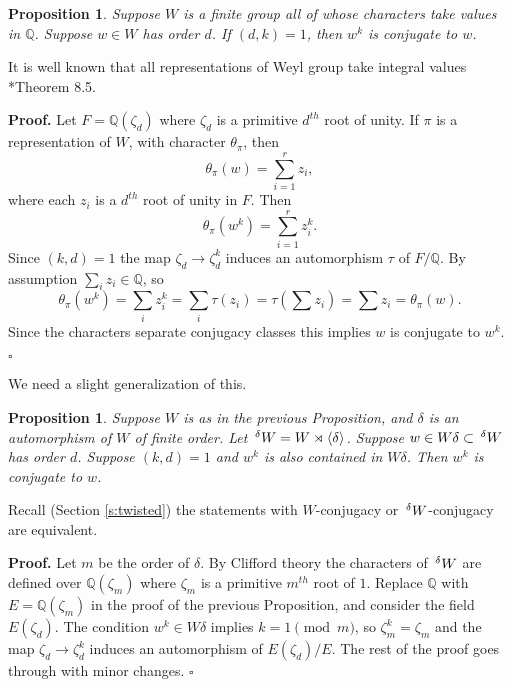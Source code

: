 \documentclass[10pt,leqno]{article}
\newtheorem{proposition}[equation]{Proposition}
\newcommand{\qed}{\hfill $\square$ \medskip}
\newenvironment{proof}[1][Proof]{\noindent\textbf{#1.} }{\qed}
\newcommand{\Q}{\mathbb Q}
\newcommand{\Wext}{\negthinspace\negthinspace\phantom{a}^\delta W}
\begin{document}
\begin{proposition}
Suppose $W$ is a finite group all of whose characters take values in $\Q$. 
Suppose $w\in W$ has order $d$. If $(d,k)=1$, then 
 $w^k$ is conjugate to $w$.
\end{proposition}

It is well known that all representations of Weyl group take integral values \cite{springer_regular}*{Theorem 8.5}.

\medskip

\begin{proof}
Let $F=\Q(\zeta_d)$ where $\zeta_d$ is a primitive $d^{th}$ root of unity.
If $\pi$ is a representation of $W$, with character $\theta_\pi$, then
$$
\theta_\pi(w)=\sum_{i=1}^r z_i,
$$
where each $z_i$ is a $d^{th}$ root of unity in $F$. Then
$$
\theta_\pi(w^k)=\sum_{i=1}^r z_i^k.
$$
Since $(k,d)=1$ the map $\zeta_d\rightarrow \zeta_d^k$ induces an automorphism $\tau$ of
$F/\Q$. By assumption  $\sum_i z_i\in \Q$, so
$$
\theta_\pi(w^k)=\sum_i z_i^k=\sum_i \tau(z_i)=\tau(\sum z_i)=\sum z_i=\theta_\pi(w).
$$
Since the characters separate conjugacy classes this implies $w$ is conjugate to $w^k$.

\end{proof}

We need a slight generalization of this.

\begin{proposition}
  \label{p:g^k}
Suppose $W$ is as in the previous Proposition, and  $\delta$
is an automorphism of $W$ of finite order. 
Let $\Wext=W\rtimes\langle\delta\rangle$. Suppose
$w\in W\delta\subset \Wext$ has order $d$.
Suppose $(k,d)=1$ and $w^k$ is also contained in $W\delta$. 
Then $w^k$ is conjugate to $w$.
\end{proposition}

Recall (Section \ref{s:twisted}) the statements with $W$-conjugacy or
$\Wext$-conjugacy are equivalent.

\begin{proof}
  Let $m$ be the order of $\delta$. By Clifford theory the characters of $\Wext$ are defined over
  $\Q(\zeta_m)$ where $\zeta_m$ is a primitive $m^{th}$ root of $1$.
  Replace $\Q$ with $E=\Q(\zeta_m)$ in the proof of the previous
  Proposition, and consider the field $E(\zeta_d)$. 
  The condition $w^k\in W\delta$ implies $k=1\pmod m$, so $\zeta_m^k=\zeta_m$ and 
  the map $\zeta_d\rightarrow \zeta_d^k$ induces an automorphism of $E(\zeta_d)/E$.
The  rest of the proof goes through with minor changes.
\end{proof}
\end{document}
